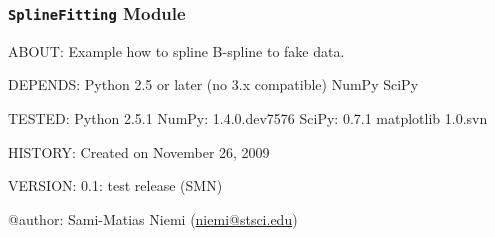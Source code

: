 \documentclass[letterpaper,10pt,english]{sphinxmanual}
\begin{document}
\subsubsection{\texttt{SplineFitting} Module}
\label{SamPy.fitting:module-SamPy.fitting.SplineFitting}\label{SamPy.fitting:splinefitting-module}
ABOUT:
Example how to spline B-spline to fake data.

DEPENDS:
Python 2.5 or later (no 3.x compatible)
NumPy
SciPy

TESTED:
Python 2.5.1
NumPy: 1.4.0.dev7576
SciPy: 0.7.1
matplotlib 1.0.svn

HISTORY:
Created on November 26, 2009

VERSION:
0.1: test release (SMN)

@author: Sami-Matias Niemi (\href{mailto:niemi@stsci.edu}{niemi@stsci.edu})

\end{document}
